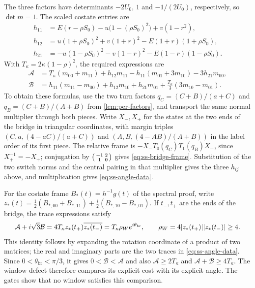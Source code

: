The three factors have determinants $-2U_0$, $1$ and $-1/(2U_0)$, respectively, so $\det m=1$.
The scaled costate entries are
\begin{align*}
 h_{11}&=E(r-\rho S_0)-u\bigl(1-(\rho S_0)^2\bigr)+v(1-r^2),\\
 h_{12}&=u(1+\rho S_0)^2+v(1+r)^2-E(1+r)(1+\rho S_0),\\
 h_{21}&=-u(1-\rho S_0)^2-v(1-r)^2-E(1-r)(1-\rho S_0).
\end{align*}
With $T_\kappa=2\kappa(1-\rho)^2$, the required expressions are
\begin{equation}\label{eq:ss-angle-data}
\begin{aligned}
 \mathcal A&=T_\kappa(m_{00}+m_{11})+h_{12}m_{11}
             -h_{11}(m_{01}+3m_{10})-3h_{21}m_{00},\\
 \mathcal B&=h_{11}(m_{11}-m_{00})+h_{12}m_{10}+h_{21}m_{01}
             +\frac{T_\kappa}{3}(3m_{10}-m_{01}).
\end{aligned}
\end{equation}
To obtain these formulas, use the two turn factors
$q_C=(C+B)/(a+C)$ and $q_B=(C+B)/(A+B)$ from \cref{lem:per-factors}, and transport the same
normal multiplier through both pieces. Write $X_-,X_+$ for the states at the two ends of the
bridge in triangular coordinates, with margin triples
$(C,a,(4-aC)/(a+C))$ and $(A,B,(4-AB)/(A+B))$ in the label order of its first piece.
The relative frame is $-X_-T_0(q_C)T_1(q_B)X_+$, since $X_+^{-1}=-X_+$; conjugation by
$\begin{psmallmatrix}-1&2\\1&0\end{psmallmatrix}$ gives \eqref{eq:ss-bridge-frame}.
Substitution of the two switch norms and the central pairing in that multiplier gives the three
$h_{ij}$ above, and multiplication gives \eqref{eq:ss-angle-data}.

For the costate frame $B_*(t)=h^{-1}g(t)$ of the spectral proof, write
$z_*(t)=\tfrac12(B_{*,00}+B_{*,11})+\tfrac i2(B_{*,10}-B_{*,01})$.
If $t_-,t_+$ are the ends of the bridge, the trace expressions satisfy
\[
 \mathcal A+i\sqrt3\mathcal B
   =4T_\kappa z_*(t_+)\overline{z_*(t_-)}
   =T_\kappa\rho_W e^{i\theta_{\mathrm{br}}},\qquad
 \rho_W=4\lvert z_*(t_+)\rvert\lvert z_*(t_-)\rvert\ge4.
\]
This identity follows by expanding the rotation coordinate of a product of two matrices; the
real and imaginary parts are the two traces in \eqref{eq:ss-angle-data}.
Since $0<\theta_{\mathrm{br}}<\pi/3$, it gives $0<\mathcal B<\mathcal A$ and also
$\mathcal A\ge2T_\kappa$ and $\mathcal A+\mathcal B\ge4T_\kappa$.
The window defect therefore compares its explicit cost with its explicit angle. The gates
show that no window satisfies this comparison.

